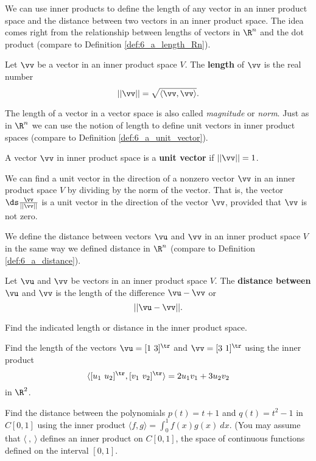 We can use inner products to define the length of any vector in an inner product space and the distance between two vectors in an inner product space. The idea comes right from the relationship between lengths of vectors in $\R^n$ and the dot product (compare to Definition \ref{def:6_a_length_Rn}). 

\begin{definition} Let $\vv$ be a vector in an inner product space $V$. The \textbf{length} of $\vv$ is the real number
\[||\vv|| = \sqrt{\langle \vv, \vv \rangle}.\]
\end{definition}

The length of a vector in a vector space is also called \emph{magnitude} or \emph{norm}. Just as in $\R^n$ we can use the notion of length to define unit vectors in inner product spaces (compare to Definition \ref{def:6_a_unit_vector}).  

\begin{definition} A vector $\vv$ in inner product space is a \textbf{unit vector} if $||\vv|| = 1$.
\end{definition}

We can find a unit vector in the direction of a nonzero vector $\vv$ in an inner product space $V$ by dividing by the norm of the vector. That is, the vector $\ds \frac{\vv}{||\vv||}$ is a unit vector in the direction of the vector $\vv$, provided that $\vv$ is not zero. 

We define the distance between vectors $\vu$ and $\vv$ in an inner product space $V$ in the same way we defined distance in $\R^n$ (compare to Definition \ref{def:6_a_distance}).

\begin{definition} Let $\vu$ and $\vv$ be vectors in an inner product space $V$. The \textbf{distance between} $\vu$ and $\vv$ is the length of the difference $\vu - \vv$ or
\[|| \vu - \vv ||.\]
\end{definition}


\begin{activity} Find the indicated length or distance in the inner product space.
	\ba
	\item Find the length of the vectors $\vu = [1 \ 3]^{\tr}$ and $\vv=[3 \ 1]^\tr$ using the inner product 
\[\langle [u_1 \ u_2]^{\tr}, [v_1 \ v_2]^{\tr} \rangle = 2u_1v_1 + 3u_2v_2\]
 in $\R^2$.
	
	
	
	\item Find the distance between the polynomials $p(t) = t+1$ and $q(t) = t^2-1$ in $C[0,1]$ using the inner product $\langle f, g \rangle = \int_0^1 f(x)g(x) \ dx$. (You may assume that $\langle \ , \ \rangle$ defines an inner product on $C[0,1]$, the space of continuous functions defined on the interval $[0,1]$.  


	
	\ea
\end{activity}




